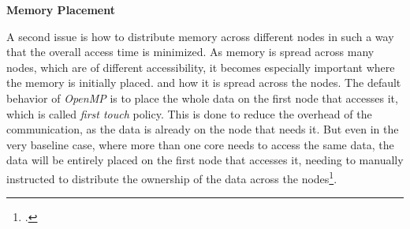 

\textbf{Memory Placement}
\label{sec:memory_placement}

A second issue is how to distribute memory across different nodes in such a way that the overall access time is minimized.
As memory is spread across many nodes, which are of different accessibility, it becomes especially important where the memory is initially placed.
and how it is spread across the nodes. The default behavior of \textit{OpenMP} is to place the whole data on the first node that accesses it,
which is called \textit{first touch} policy. This is done to reduce the overhead of the communication, as the data is already on the node that needs it.
But even in the very baseline case, where more than one core needs to access the same data, the data will be entirely placed on the first node that accesses it,
needing to manually instructed to distribute the ownership of the data across the nodes\footcite{ruudvanderpasSpeedYourOpenMP}.



